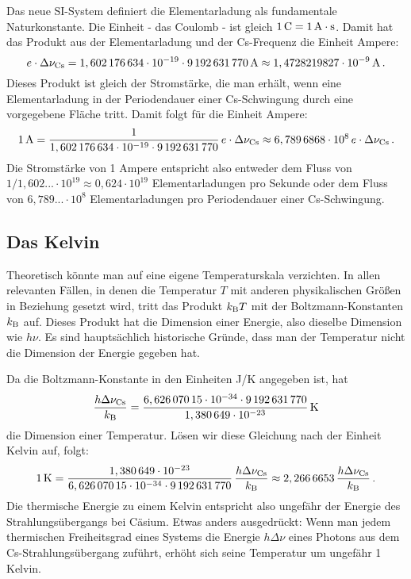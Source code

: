 Das neue SI-System definiert die Elementarladung als fundamentale Naturkonstante. 
Die Einheit - das Coulomb - ist gleich $1 \, {\rm C= 1\, A \cdot s}$. Damit hat das Produkt aus der
Elementarladung und der Cs-Frequenz die Einheit Ampere:
\begin{equation}
       e \cdot \Delta \nu_{\rm Cs} = 1,602\,176\,634 \cdot 10^{-19} \cdot 9\,192\,631\,770\, {\rm A} \approx
            1,4728219827 \cdot 10^{-9} \,{\rm A} \, .
\end{equation}
Dieses Produkt ist gleich der Stromst\"arke, die man erh\"alt, wenn eine Elementarladung in der Periodendauer 
einer Cs-Schwingung durch eine vorgegebene Fl\"ache tritt. Damit folgt f\"ur die Einheit Ampere:
\begin{equation}
     1\,{\rm A} = \frac{1}{1,602\,176\,634 \cdot 10^{-19} \cdot 9\,192\,631\,770} \, e \cdot \Delta \nu_{\rm Cs} \approx
           6,789\,6868 \cdot 10^8 \,  e \cdot \Delta \nu_{\rm Cs} \, .
\end{equation}
Die Stromst\"arke von 1 Ampere entspricht also entweder dem Fluss von 
$1/1,602...\cdot 10^{19} \approx 0,624\cdot 10^{19}$ 
Elementarladungen pro Sekunde oder dem Fluss von $6,789... \cdot 10^8$ Elementarladungen
pro Periodendauer einer Cs-Schwingung. 

\subsection{Das Kelvin}

Theoretisch k\"onnte man auf eine eigene Temperaturskala verzichten. In allen relevanten
F\"allen, in denen die Temperatur $T$ mit anderen physikalischen Gr\"o\ss en in Beziehung
gesetzt wird, tritt das Produkt $k_{\rm B}T$ mit der Boltzmann-Konstanten $k_{\rm B}$ 
auf. Dieses Produkt hat die Dimension einer Energie, also
dieselbe Dimension wie $h\nu$. Es sind haupts\"achlich historische Gr\"unde, dass man der
Temperatur nicht die Dimension der Energie gegeben hat. 

Da die Boltzmann-Konstante in den Einheiten J/K angegeben
ist, hat
\begin{equation}
    \frac{h \Delta \nu_{\rm Cs}}{k_{\rm B}} = 
    \frac{6,626\,070\,15 \cdot 10^{-34} \cdot 9\,192\,631\,770}{1,380\,649 \cdot 10^{-23}} \, {\rm K}
\end{equation}
die Dimension einer Temperatur. L\"osen wir diese Gleichung nach der Einheit Kelvin auf, folgt:
\begin{equation}
   1\,{\rm K} =      \frac{1,380\,649 \cdot 10^{-23}}{6,626\,070\,15 \cdot 10^{-34} \cdot 9\,192\,631\,770} \, 
    \frac{h \Delta \nu_{\rm Cs}}{k_{\rm B}} \approx 2,266\,6653 \,  \frac{h \Delta \nu_{\rm Cs}}{k_{\rm B}} \, .
\end{equation}
Die thermische Energie zu einem Kelvin entspricht also ungef\"ahr der Energie des Strahlungs\"ubergangs
bei C\"asium. Etwas anders ausgedr\"uckt: Wenn man jedem thermischen Freiheitsgrad eines Systems
die Energie $h \Delta \nu$ eines Photons aus dem Cs-Strahlungs\"ubergang zuf\"uhrt, erh\"oht sich
seine Temperatur um ungef\"ahr 1 Kelvin. 

